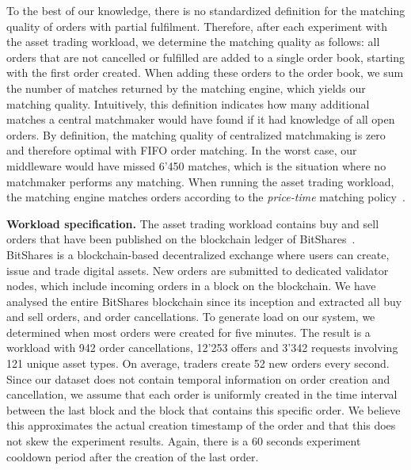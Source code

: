 To the best of our knowledge, there is no standardized definition for the matching quality of orders with partial fulfilment.
Therefore, after each experiment with the asset trading workload, we determine the matching quality as follows: all orders that are not cancelled or fulfilled are added to a single order book, starting with the first order created.
When adding these orders to the order book, we sum the number of matches returned by the matching engine, which yields our matching quality.
Intuitively, this definition indicates how many additional matches a central matchmaker would have found if it had knowledge of all open orders.
By definition, the matching quality of centralized matchmaking is zero and therefore optimal with FIFO order matching.
In the worst case, our middleware would have missed 6'450 matches, which is the situation where no matchmaker performs any matching.
When running the asset trading workload, the matching engine matches orders according to the \emph{price-time} matching policy~\cite{mavroudis2019libra}.

\textbf{Workload specification.}
The asset trading workload contains buy and sell orders that have been published on the blockchain ledger of BitShares~\cite{schuh2017bitshares}.
BitShares is a blockchain-based decentralized exchange where users can create, issue and trade digital assets.
New orders are submitted to dedicated validator nodes, which include incoming orders in a block on the blockchain.
We have analysed the entire BitShares blockchain since its inception and extracted all buy and sell orders, and order cancellations.
To generate load on our system, we determined when most orders were created for five minutes.
The result is a workload with 942 order cancellations, 12'253 offers and 3'342 requests involving 121 unique asset types.
On average, traders create 52 new orders every second.
Since our dataset does not contain temporal information on order creation and cancellation, we assume that each order is uniformly created in the time interval between the last block and the block that contains this specific order.
We believe this approximates the actual creation timestamp of the order and that this does not skew the experiment results.
Again, there is a 60 seconds experiment cooldown period after the creation of the last order.

